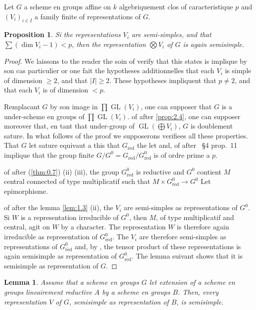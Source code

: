 \documentclass[11pt,a4paper]{article}
\theoremstyle{plain}
\newtheorem{lemma}[theorem]{Lemma}
\newtheorem{proposition}[theorem]{Proposition}
\theoremstyle{definition}
\DeclareMathOperator{\GL}{GL}
\newcommand{\red}{\mathrm{r\acute{e}d}}
\begin{document}
Let $G$ a scheme en groups affine on $k$ algebriquement clos of caracteristique $p$ and $(V_i)_{i \in I}$ a family finite of representations of $G$.

\begin{proposition}\label{prop:3.1}
Si the representations $V_i$ are semi-simples, and that $\sum (\dim V_i - 1) < p$, then the representation $\bigotimes V_i$ of $G$ is again semisimple.
\end{proposition}

\begin{proof}
We laissons to the reader the soin of verify that this states is implique by son cas particulier or one fait the hypotheses additionnelles that each $V_i$ is simple of dimension $\geq 2$, and that $|I| \geq 2$. These hypotheses impliquent that $p \neq 2$, and that each $V_i$ is of dimension $< p$.

Remplacant $G$ by son image in $\prod \GL(V_i)$, one can supposer that $G$ is a under-scheme en groups of $\prod \GL(V_i)$. of after \ref{prop:2.4}, one can supposer moreover that, en tant that under-group of $\GL(\bigoplus V_i)$, $G$ is doublement sature. In what follows of the proof we supposerons verifiees all these properties. That $G$ let sature equivaut a this that $G_\red$ the let and, of after \cite{Serre1994}~\S4 prop.~11 implique that the group finite $G/G^0 = G_\red/G^0_\red$ is of ordre prime a $p$.

of after (\ref{thm:0.7}) (ii) (iii), the group $G^0_\red$ is reductive and $G^0$ contient $M$ central connected of type multiplicatif such that $M \times G^0_\red \to G^0$ Let epimorphisme.

of after the lemma \ref{lem:1.3} (ii), the $V_i$ are semi-simples as representations of $G^0$. Si $W$ is a representation irreducible of $G^0$, then $M$, of type multiplicatif and central, agit on $W$ by a character. The representation $W$ is therefore again irreducible as representation of $G^0_\red$. The $V_i$ are therefore semi-simples as representations of $G^0_\red$ and, by \cite{Serre1994}, the tensor product of these representations is again semisimple as representation of $G^0_\red$. The lemma suivant shows that it is semisimple as representation of $G$.
\end{proof}

\begin{lemma}\label{lem:3.2}
Assume that a scheme en groups $G$ let extension of a scheme en groups lineairement reductive $A$ by a scheme en groups $B$. Then, every representation $V$ of $G$, semisimple as representation of $B$, is semisimple.
\end{lemma}
\end{document}
